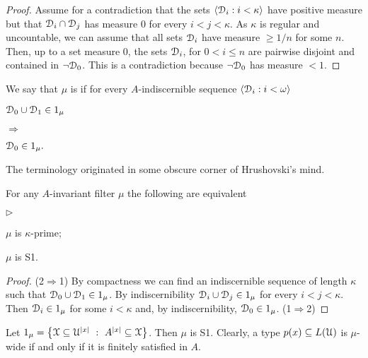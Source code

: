 \documentclass{amsproc}
\newcommand{\mylabel}[1]{{#1}\hfill}
\renewenvironment{itemize}
  {\begin{list}{$\triangleright$}{%
  \setlength{\parskip}{0mm}
  \setlength{\topsep}{.4\baselineskip}
  \setlength{\rightmargin}{0mm}
  \setlength{\listparindent}{0mm}
  \setlength{\itemindent}{0mm}
  \setlength{\labelwidth}{3ex}
  \setlength{\itemsep}{.2\baselineskip}
  \setlength{\parsep}{.2\baselineskip}
  \setlength{\partopsep}{0mm}
  \setlength{\labelsep}{1ex}
  \setlength{\leftmargin}{\labelwidth+\labelsep}
  \let\makelabel\mylabel}}{%
\end{list}}
\renewcommand*{\emph}[1]{%
   \smash{\tikz[baseline]\node[rectangle, fill=teal!25, rounded corners, inner xsep=0.5ex, inner ysep=0.2ex, anchor=base, minimum height = 2.7ex]{\strut #1};}}
\begin{document}
\begin{proof}
  Assume for a contradiction that the sets $\langle\EuScript D_i:i<\kappa\rangle$ have positive measure but that $\EuScript D_i\cap \EuScript D_j$ has measure $0$ for every $i<j<\kappa$.
  As $\kappa$ is regular and uncountable, we can assume that all sets $\EuScript D_i$ have measure $\ge 1/n$ for some $n$.
  Then, up to a set measure $0$, the sets $\EuScript D_i$, for $0<i\le n$ are pairwise disjoint and contained in $\neg\EuScript D_0$.
  This is a contradiction because $\neg\EuScript D_0$ has measure $<1$.
\end{proof}

We say that $\mu$ is \emph{S1\/} if for every $A$-indiscernible sequence $\langle\EuScript D_i:i<\omega\rangle$
    
\def\ceq#1#2#3{\parbox[t]{25ex}{$\displaystyle #1$}\parbox{6ex}{\hfil $#2$}{$\displaystyle #3$}}

\ceq{\hfill\EuScript D_0\cup\EuScript D_1\in1_\mu}{\Rightarrow}{\EuScript D_0\in1_\mu.}

The terminology originated in some obscure corner of Hrushovski's mind.

\begin{fact}
  For any $A$-invariant filter $\mu$ the following are equivalent
  \begin{itemize}
    \item[1.] $\mu$ is $\kappa$-prime;
    \item[2.] $\mu$ is S1.
  \end{itemize}
\end{fact}

\begin{proof}
  (2$\Rightarrow$1) By compactness we can find an indiscernible sequence of length $\kappa$ such that $\EuScript D_0\cup\EuScript D_1\in1_\mu$.
  By indiscernibility $\EuScript D_i\cup\EuScript D_j\in1_\mu$ for every $i<j<\kappa$.
  Then $\EuScript D_i\in1_\mu$ for some $i<\kappa$ and, by indiscernibility,  $\EuScript D_0\in1_\mu$.
  (1$\Rightarrow$2) 
\end{proof}

\begin{example}\label{ex_mu_fin_sat}
  Let $1_\mu=\big\{\EuScript X\subseteq\EuScript U^{|x|}\ :\ A^{|x|}\subseteq\EuScript X\big\}$.
  Then $\mu$ is S1.
  Clearly, a type $p(x)\subseteq L(\EuScript U)$ is $\mu$-wide if and only if it is finitely satisfied in $A$.
\end{example}
\end{document}
